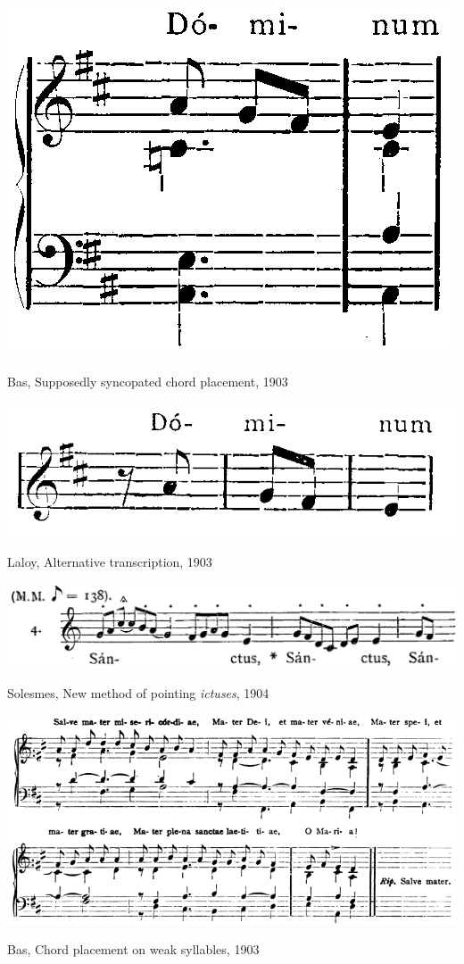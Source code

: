 \begin{example}
  \centering
  \includegraphics[width=.4\linewidth]{c/4/ex/bas_allsaints.png}
  \caption{Bas, Supposedly syncopated chord placement, 1903}
  \label{mus:bas_allsaints}
\end{example}

\vspace*{\fill}

\begin{example}
  \centering
  \includegraphics[width=.5\linewidth]{c/4/ex/laloy_dominum.png}
  \caption{Laloy, Alternative transcription, 1903}
  \label{mus:laloy_dominum}
\end{example}

\vspace*{\fill}

\begin{example}
  \centering
  \includegraphics[width=.9\linewidth]{c/4/ex/solesmes_pointing_26.png}
  \caption{Solesmes, New method of pointing \emph{ictuses}, 1904}
  \label{mus:solesmes_pointing_26}
\end{example}

\vspace*{\fill}

\newpage

\vspace*{\fill}

\begin{example}
  \centering
  \includegraphics[width=\linewidth]{c/4/ex/bas_salve.png}
  \caption{Bas, Chord placement on weak syllables, 1903}
  \label{mus:bas_salve}
\end{example}

